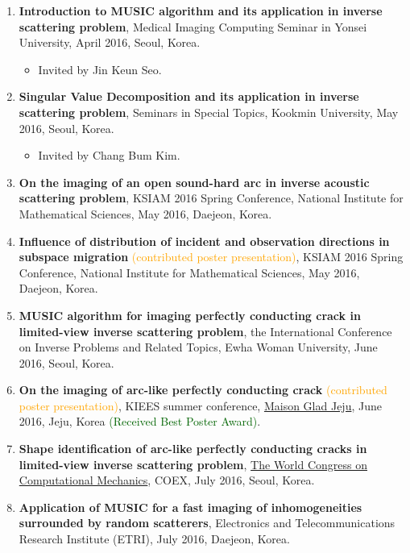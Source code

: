 \documentclass[10pt,A4]{article}
\begin{document}
\begin{enumerate}
\item\label{P-MICS2016} \textbf{Introduction to MUSIC algorithm and its application in inverse scattering problem}, Medical Imaging Computing Seminar in Yonsei University, April 2016, Seoul, Korea.
\begin{itemize}
\item Invited by Jin Keun Seo.
\end{itemize}
\item\label{P-KMU2016} \textbf{Singular Value Decomposition and its application in inverse scattering problem}, Seminars in Special Topics, Kookmin University, May 2016, Seoul, Korea.
\begin{itemize}
\item Invited by Chang Bum Kim.
\end{itemize}
\item\label{P-KSIAM2016A} \textbf{On the imaging of an open sound-hard arc in inverse acoustic scattering problem}, KSIAM 2016 Spring Conference, National Institute for Mathematical Sciences, May 2016, Daejeon, Korea.
\item\label{P-KSIAM2016B} \textbf{Influence of distribution of incident and observation directions in subspace migration} \textcolor{orange}{(contributed poster presentation)}, KSIAM 2016 Spring Conference, National Institute for Mathematical Sciences, May 2016, Daejeon, Korea.
\item\label{P-ICIP2016} \textbf{MUSIC algorithm for imaging perfectly conducting crack in limited-view inverse scattering problem}, the  International Conference on Inverse Problems and Related Topics, Ewha Woman University, June 2016, Seoul, Korea.
\item\label{P-KIEES2016} \textbf{On the imaging of arc-like perfectly conducting crack} \textcolor{orange}{(contributed poster presentation)}, KIEES summer conference, \href{https://ora.oraresort.com/kor/GRD/index.php?}{Maison Glad Jeju}, June 2016, Jeju, Korea \textcolor{darkgreen}{(Received Best Poster Award)}.
\item\label{P-WCCM2016} \textbf{Shape identification of arc-like perfectly conducting cracks in limited-view inverse scattering problem}, \href{http://www.wccm2016.org/main/}{The  World Congress on Computational Mechanics}, COEX, July 2016, Seoul, Korea.
\item\label{P-ETRI2016} \textbf{Application of MUSIC for a fast imaging of  inhomogeneities surrounded by random scatterers}, Electronics and Telecommunications Research Institute (ETRI), July 2016, Daejeon, Korea.

\end{enumerate}
\end{document}

